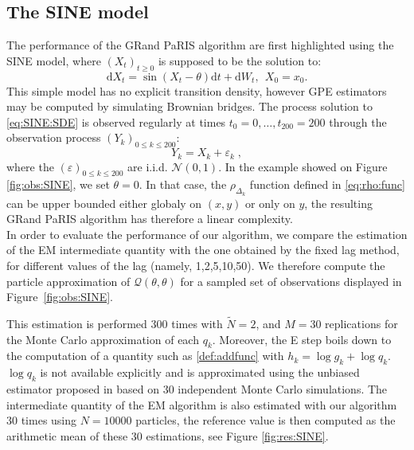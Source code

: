 \documentclass[12pt]{article}
\newcommand{\rmd}{\mathrm{d}}
\newcommand{\eqsp}{\;}
\newcommand{\1}{\mathrm{1}}
\begin{document}
\subsection*{The SINE model} 
The performance of the GRand PaRIS algorithm are first highlighted using the SINE model, where $(X_t)_{t\geq 0}$ is supposed to be the solution to: 
\begin{equation}
\rmd X_t = \sin \left(X_t-\theta\right)\rmd t + \rmd W_t,~~X_0=x_0. \label{eq:SINE:SDE}
\end{equation}
This simple model has no explicit transition density, however GPE estimators may be computed by simulating Brownian bridges.
The process solution to \eqref{eq:SINE:SDE} is observed regularly at times $t_0=0,\ldots,t_{200}=200$ through the observation process $(Y_k)_{0\leq k \leq 200}$:
\begin{equation}
Y_k = X_k + \varepsilon_k\label{eq:obs:SINE}\eqsp,
\end{equation}
where the $(\varepsilon)_{0\leq k \leq 200}$ are i.i.d. $\mathcal{N}(0,1)$.
In the example showed on Figure \ref{fig:obs:SINE}, we set $\theta=0$.
In that case, the $\rho_{\Delta_k}$ function defined in \eqref{eq:rho:func} can be upper bounded either globaly on $(x,y)$ or only on $y$, the resulting GRand PaRIS algorithm has therefore a linear complexity.\\
In order to evaluate the performance of our algorithm, we compare the estimation of the EM intermediate quantity with the one obtained by the fixed lag method, for different values of the lag (namely, 1,2,5,10,50). We therefore compute the particle approximation of $\mathcal{Q}(\theta,\theta)$ for a sampled set of observations displayed in Figure~\ref{fig:obs:SINE}.

This estimation is performed 300 times with $\tilde{N}=2$, and $M=30$ replications for the Monte Carlo approximation of each $q_k$.  Moreover, the E step boils down to the computation of a quantity such as \eqref{def:addfunc} with $h_k= \log g_k + \log q_k$.  $\log q_k$ is not available explicitly and is approximated using the unbiased estimator proposed in \cite[Appendix B]{olsson:strojby:2011} based on 30 independent Monte Carlo simulations.
The intermediate quantity of the EM algorithm is also estimated                                                                                                                                                                                                                                                                                                                                                                                                                                                                                                                                                      with our algorithm 30 times using $N=10000$ particles, the reference value is then computed as the arithmetic mean of these 30 estimations, see Figure \ref{fig:res:SINE}.
\end{document}
